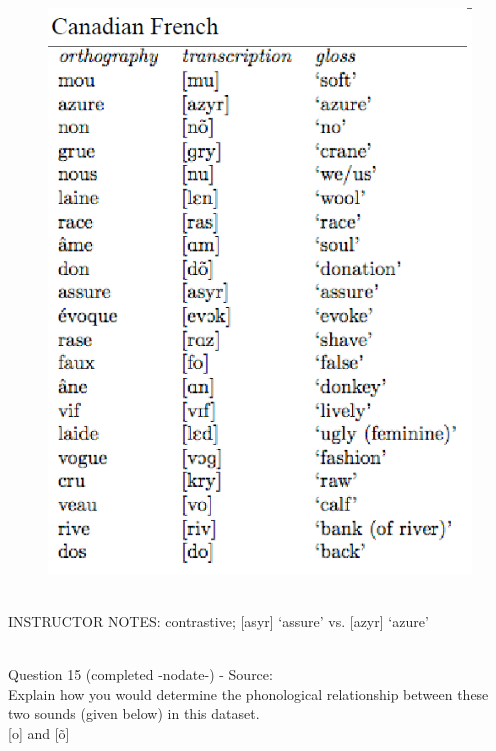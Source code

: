 \documentclass[12pt]{article}
\begin{document}
\begin{figure}[H]
\includegraphics{../images/canadianfrench.png}
\end{figure}

~\\
INSTRUCTOR NOTES: contrastive; [asyr] ‘assure’ vs. [azyr] ‘azure’


~\\

{\large Question 15} (completed -nodate-) - Source: \\

Explain how you would determine the phonological relationship between these two sounds (given below) in this dataset.\\

{[o]} and {[õ]}
\end{document}
